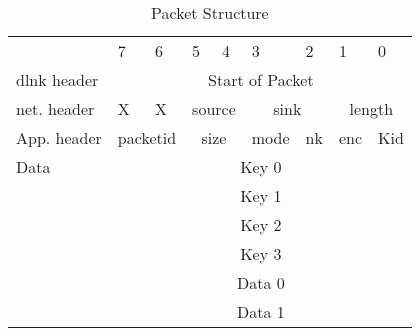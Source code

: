 \documentclass[10pt, conference, compsocconf]{IEEEtran}
\begin{document}
\begin{table}[!htbp]
  \caption{Packet Structure}
  \label{tab:packet}
  \begin{center}
    {\scriptsize
    \begin{tabular}{ m{1.2cm} | m{0.4cm} | m{0.4cm} | m{0.4cm} | m{0.4cm} | m{0.4cm} | m{0.4cm} | m{0.4cm} | m{0.4cm} |}
        & 7 & 6 & 5 & 4 & 3 & 2 & 1 & 0 \\
      \cline{2-9} %
      dlnk header & \multicolumn{8}{c|}{Start of Packet}\\
      \cline{2-9} %

      net. header & X & X & \multicolumn{2}{c|}{source} & \multicolumn{2}{c|}{sink} & \multicolumn{2}{c|}{length}\\ 
      \cline{2-9} %
      App. header & \multicolumn{2}{c|}{packetid} & \multicolumn{2}{c|}{size} & mode & nk & enc & Kid\\ 
      \cline{2-9} %
      Data & \multicolumn{8}{c|}{Key 0}\\
      \cline{2-9} 
      \cline{2-9} %
      & \multicolumn{8}{c|}{Key 1}\\
      \cline{2-9} %
      & \multicolumn{8}{c|}{Key 2}\\
      \cline{2-9} %
      & \multicolumn{8}{c|}{Key 3}\\ 
      \cline{2-9} %
      & \multicolumn{8}{c|}{Data 0}\\
      \cline{2-9} %
      & \multicolumn{8}{c|}{Data 1}\\ 
      \cline{2-9} %
    \end{tabular}
    }
  \end{center}
\end{table}



\end{document}
